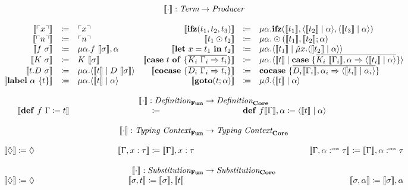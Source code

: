 \[
  \begin{array}{rcl rcl}
    \multicolumn{6}{c}{\translate{\cdot} : \emph{Term} \rightarrow \emph{Producer}}\\
    \\
    \translate{\lit{x}} & \coloneq & \lit{x} & 
    \translate{\ifz{t_1}{t_2}{t_3}} & \coloneq & \mu\alpha.\ifz{\translate{t_1}}{\cut{\translate{t_2}}{\alpha}}{\cut{\translate{t_3}}{\alpha}} \\
    \translate{\lit{n}} & \coloneq & \lit{n}  &  
    \translate{t_1 \odot t_2} & \coloneq & \mu\alpha.\odot(\translate{t_1}, \translate{t_2}; \alpha)  \\
    \translate{f\ \sigma} & \coloneq & \mu\alpha.f\ \translate{\sigma}, \alpha  & 
    \translate{\letin{x}{t_1}{t_2}} & \coloneq & \mu\alpha.\cut{\translate{t_1}}{\tilde{\mu}x.\cut{\translate{t_2}}{\alpha}} \\
    \translate{K\ \sigma} & \coloneq & K\ \translate{\sigma} &  
    \translate{\caseof{t}{\overline{K_i\ \Gamma_i \Rightarrow t_i}}} & \coloneq & \mu\alpha.\cut{\translate{t}}{\case{\overline{K_i\ \translate{\Gamma_i},\alpha \Rightarrow \cut{\translate{t_i}}{\alpha}}}}  \\
    \translate{t.D\ \sigma} & \coloneq & \mu\alpha.\cut{\translate{t}}{D\ \translate{\sigma}}   & 
    \translate{\cocase{\overline{D_i\ \Gamma_i \Rightarrow t_i}}} & \coloneq & \cocase{\overline{D_i\translate{\Gamma_i},\alpha_i \Rightarrow \cut{\translate{t_i}}{\alpha_i}}}  \\
    \translate{\lab{\alpha}{t}} & \coloneq & \mu\alpha.\cut{\translate{t}}{\alpha} & 
    \translate{\goto{t}{\alpha}} & \coloneq & \mu\beta.\cut{\translate{t}}{\alpha}  \\
    \\
    \multicolumn{6}{c}{\translate{\cdot{}}{} : \emph{Definition}_{\surfacelang{}} \rightarrow \emph{Definition}_{\targetlang{}}}\\
    \multicolumn{2}{r}{\translate{\defi{f\ \Gamma}{t}}{}} & \multicolumn{2}{c}{\coloneq} & \multicolumn{2}{l}{\defi{f\translate{\Gamma},\alpha}{\cut{\translate{t}}{\alpha}}} \\
    \\
    \multicolumn{6}{c}{\translate{\cdot{}}{}: \emph{Typing Context}_{\surfacelang{}}\rightarrow \emph{Typing Context}_{\targetlang{}}}\\
    \\
    \multicolumn{2}{l}{\translate{\nil} \coloneq \nil} & 
    \multicolumn{2}{c}{\translate{\Gamma,x:\tau} \coloneq \translate{\Gamma},x:\tau} &
    \multicolumn{2}{r}{\translate{\Gamma,\alpha\cnt\tau} \coloneq \translate{\Gamma},\alpha\cnt\tau}\\
    \\
    \multicolumn{6}{c}{\translate{\cdot{}}{}:\emph{Substitution}_{\surfacelang{}}\rightarrow\emph{Substitution}_{\targetlang{}}}\\
    \multicolumn{2}{l}{\translate{\nil} \coloneq \nil} & 
    \multicolumn{2}{c}{\translate{\sigma,t} \coloneq \translate{\sigma},\translate{t}} &
    \multicolumn{2}{r}{\translate{\sigma,\alpha} \coloneq \translate{\sigma},\alpha}\\
    \\
  \end{array}
\]
